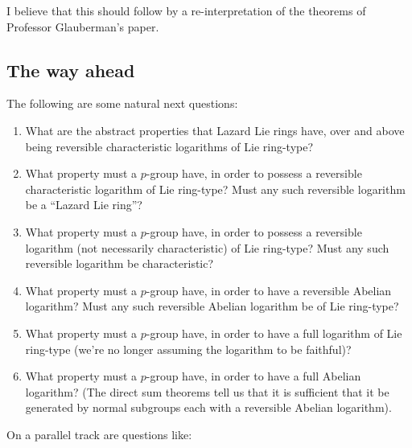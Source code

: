 \documentclass[a4paper]{amsart}
\begin{document}
I believe that this should follow by a re-interpretation of the
theorems of Professor Glauberman's paper.

\subsection{The way ahead}

The following are some natural next questions:

\begin{enumerate}

\item What are the abstract properties that Lazard Lie rings have,
  over and above being reversible characteristic logarithms of Lie ring-type?

\item What property must a $p$-group have, in order to possess a
  reversible characteristic logarithm of Lie ring-type? Must any such
  reversible logarithm be a ``Lazard Lie ring''?

\item What property must a $p$-group have, in order to possess a
  reversible logarithm (not necessarily characteristic) of Lie
  ring-type? Must any such reversible logarithm be characteristic? 
  
\item What property must a $p$-group have, in order to have a
  reversible Abelian logarithm? Must any such reversible Abelian
  logarithm be of Lie ring-type?

\item What property must a $p$-group have, in order to have a full
  logarithm of Lie ring-type (we're no longer assuming the logarithm
  to be faithful)?

\item What property must a $p$-group have, in order to have a full
  Abelian logarithm? (The direct sum theorems tell us that it is
  sufficient that it be generated by normal subgroups each with a
  reversible Abelian logarithm).

\end{enumerate}

On a parallel track are questions like:
\end{document}
